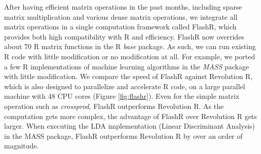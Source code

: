 \documentclass[simplex.tex]{subfiles}
\begin{document}
After having efficient matrix operations in the past months, including sparse
matrix multiplication and various dense matrix operations, we integrate all
matrix operations in a single computation framework called FlashR, which
provides both high compatibility with R and efficiency. FlashR now overrides
about 70 R matrix functions in the R
\textit{base} package. As such, we can run existing R code with little
modification or no modification at all. For example, we ported a few R
implementations of machine learning algorithms in the \textit{MASS} package
with little modification. We compare the speed of FlashR against Revolution R,
which is also designed to parallelize and accelerate R code, on a large parallel
machine with 48 CPU cores (Figure \ref{fig:flashr}).
Even for the simple matrix operation such as \textit{crossprod}, FlashR
outperforms Revolution R. As the computation gets more complex, the advantage
of FlashR over Revolution R gets larger. When executing the LDA implementation
(Linear Discriminant Analysis) in the MASS package, FlashR outperforms Revolution R
by over an order of magnitude.
\end{document}
